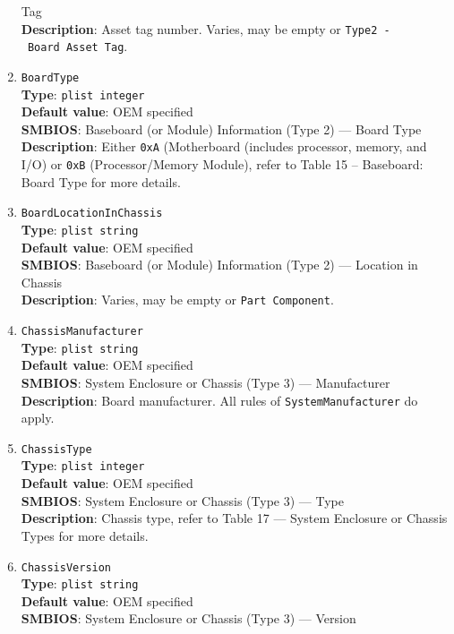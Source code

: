 \documentclass[]{article}
\begin{document}
\begin{enumerate}
  Tag\\
  \textbf{Description}: Asset tag number. Varies, may be empty or
  \texttt{Type2\ -\ Board\ Asset\ Tag}.
\item
  \texttt{BoardType}\\
  \textbf{Type}: \texttt{plist\ integer}\\
  \textbf{Default value}: OEM specified\\
  \textbf{SMBIOS}: Baseboard (or Module) Information (Type 2) --- Board
  Type\\
  \textbf{Description}: Either \texttt{0xA} (Motherboard (includes
  processor, memory, and I/O) or \texttt{0xB} (Processor/Memory Module),
  refer to Table 15 -- Baseboard: Board Type for more details.
\item
  \texttt{BoardLocationInChassis}\\
  \textbf{Type}: \texttt{plist\ string}\\
  \textbf{Default value}: OEM specified\\
  \textbf{SMBIOS}: Baseboard (or Module) Information (Type 2) --- Location
  in Chassis\\
  \textbf{Description}: Varies, may be empty or
  \texttt{Part\ Component}.
\item
  \texttt{ChassisManufacturer}\\
  \textbf{Type}: \texttt{plist\ string}\\
  \textbf{Default value}: OEM specified\\
  \textbf{SMBIOS}: System Enclosure or Chassis (Type 3) --- Manufacturer\\
  \textbf{Description}: Board manufacturer. All rules of
  \texttt{SystemManufacturer} do apply.
\item
  \texttt{ChassisType}\\
  \textbf{Type}: \texttt{plist\ integer}\\
  \textbf{Default value}: OEM specified\\
  \textbf{SMBIOS}: System Enclosure or Chassis (Type 3) --- Type\\
  \textbf{Description}: Chassis type, refer to Table 17 --- System
  Enclosure or Chassis Types for more details.
\item
  \texttt{ChassisVersion}\\
  \textbf{Type}: \texttt{plist\ string}\\
  \textbf{Default value}: OEM specified\\
  \textbf{SMBIOS}: System Enclosure or Chassis (Type 3) --- Version\\

\end{enumerate}
\end{document}
